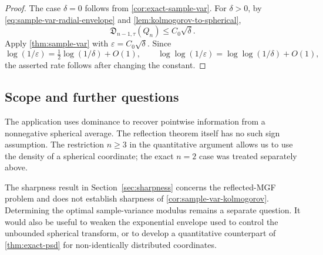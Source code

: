 
\begin{proof}
The case $\delta=0$ follows from \cref{cor:exact-sample-var}. For $\delta>0$, by \eqref{eq:sample-var-radial-envelope} and \cref{lem:kolmogorov-to-spherical},
\[
\mathfrak D_{n-1,\tau}(Q_n)\le C_0\sqrt\delta.
\]
Apply \cref{thm:sample-var} with $\varepsilon=C_0\sqrt\delta$. Since
\[
\log(1/\varepsilon)=\tfrac12\log(1/\delta)+O(1),
\qquad
\log\log(1/\varepsilon)=\log\log(1/\delta)+O(1),
\]
the asserted rate follows after changing the constant.
\end{proof}

\subsection{Scope and further questions}

The application uses dominance to recover pointwise information from a nonnegative spherical average. The reflection theorem itself has no such sign assumption. The restriction $n\ge3$ in the quantitative argument allows us to use the density of a spherical coordinate; the exact $n=2$ case was treated separately above.

The sharpness result in Section~\ref{sec:sharpness} concerns the reflected-MGF problem and does not establish sharpness of \cref{cor:sample-var-kolmogorov}. Determining the optimal sample-variance modulus remains a separate question. It would also be useful to weaken the exponential envelope used to control the unbounded spherical transform, or to develop a quantitative counterpart of \cref{thm:exact-psd} for non-identically distributed coordinates.
